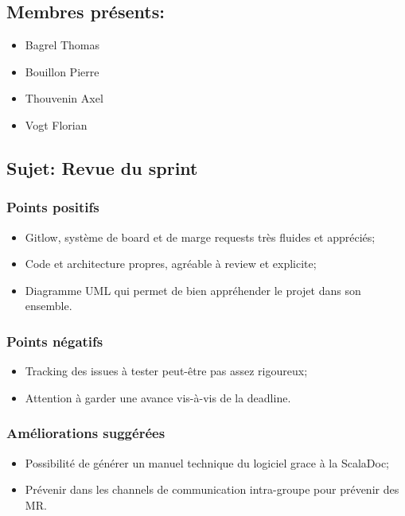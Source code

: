 \documentclass[a4paper, 12pt]{report}
\begin{document}
\subsection*{Membres présents:}

\begin{itemize}

\item
  Bagrel Thomas
\item
  Bouillon Pierre
\item
  Thouvenin Axel
\item
  Vogt Florian
\end{itemize}

\subsection*{Sujet: Revue du sprint }

\subsubsection*{Points positifs}

\begin{itemize}

\item
  Gitlow, système de board et de marge requests très fluides et
  appréciés;
\item
  Code et architecture propres, agréable à review et explicite;
\item
  Diagramme UML qui permet de bien appréhender le projet dans son
  ensemble.
\end{itemize}

\subsubsection*{Points négatifs}

\begin{itemize}

\item
  Tracking des issues à tester peut-être pas assez rigoureux;
\item
  Attention à garder une avance vis-à-vis de la deadline.
\end{itemize}

\subsubsection{Améliorations suggérées}

\begin{itemize}

\item
  Possibilité de générer un manuel technique du logiciel grace à la
  ScalaDoc;
\item
  Prévenir dans les channels de communication intra-groupe pour prévenir
  des MR.
\end{itemize}
\end{document}
